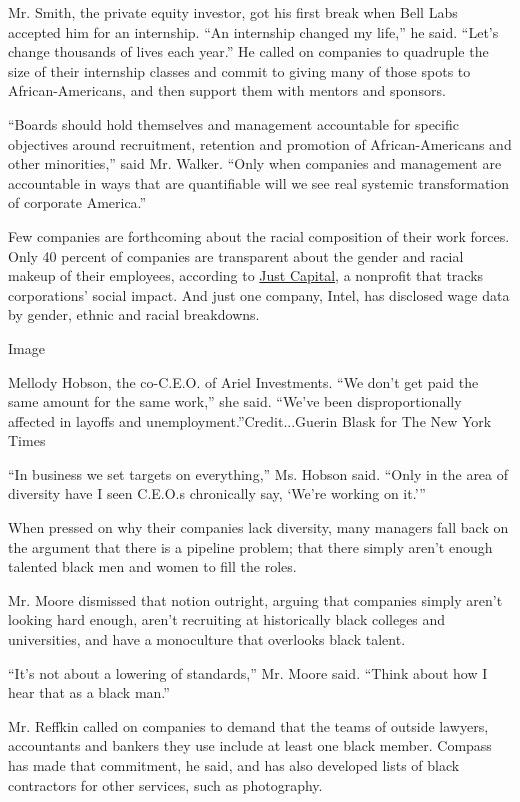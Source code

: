 Mr. Smith, the private equity investor, got his first break when Bell
Labs accepted him for an internship. ``An internship changed my life,''
he said. ``Let's change thousands of lives each year.'' He called on
companies to quadruple the size of their internship classes and commit
to giving many of those spots to African-Americans, and then support
them with mentors and sponsors.

``Boards should hold themselves and management accountable for specific
objectives around recruitment, retention and promotion of
African-Americans and other minorities,'' said Mr. Walker. ``Only when
companies and management are accountable in ways that are quantifiable
will we see real systemic transformation of corporate America.''

Few companies are forthcoming about the racial composition of their work
forces. Only 40 percent of companies are transparent about the gender
and racial makeup of their employees, according to
\href{https://www.nytimes3xbfgragh.onion/2015/12/21/business/a-plan-to-rank-just-companies-aims-to-close-the-wealth-gap.html}{Just
Capital}, a nonprofit that tracks corporations' social impact. And just
one company, Intel, has disclosed wage data by gender, ethnic and racial
breakdowns.

Image

Mellody Hobson, the co-C.E.O. of Ariel Investments. ``We don't get paid
the same amount for the same work,'' she said. ``We've been
disproportionally affected in layoffs and unemployment.''Credit...Guerin
Blask for The New York Times

``In business we set targets on everything,'' Ms. Hobson said. ``Only in
the area of diversity have I seen C.E.O.s chronically say, `We're
working on it.'''

When pressed on why their companies lack diversity, many managers fall
back on the argument that there is a pipeline problem; that there simply
aren't enough talented black men and women to fill the roles.

Mr. Moore dismissed that notion outright, arguing that companies simply
aren't looking hard enough, aren't recruiting at historically black
colleges and universities, and have a monoculture that overlooks black
talent.

``It's not about a lowering of standards,'' Mr. Moore said. ``Think
about how I hear that as a black man.''

Mr. Reffkin called on companies to demand that the teams of outside
lawyers, accountants and bankers they use include at least one black
member. Compass has made that commitment, he said, and has also
developed lists of black contractors for other services, such as
photography.

